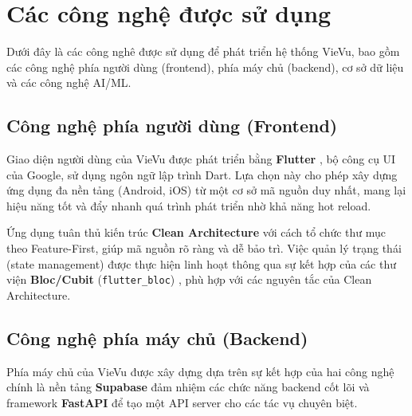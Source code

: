 \section{Các công nghệ được sử dụng}
Dưới đây là các công nghê được sử dụng để phát triển hệ thống VieVu, bao gồm các công nghệ phía người dùng (frontend), phía máy chủ (backend), cơ sở dữ liệu và các công nghệ AI/ML.
\subsection{Công nghệ phía người dùng (Frontend)}
\label{subsec:frontend_tech}

Giao diện người dùng của VieVu được phát triển bằng \textbf{Flutter} \cite{flutter_doc}, bộ công cụ UI của Google, sử dụng ngôn ngữ lập trình Dart. Lựa chọn này cho phép xây dựng ứng dụng đa nền tảng (Android, iOS) từ một cơ sở mã nguồn duy nhất, mang lại hiệu năng tốt và đẩy nhanh quá trình phát triển nhờ khả năng hot reload.

Ứng dụng tuân thủ kiến trúc \textbf{Clean Architecture} \cite{clean_arch} với cách tổ chức thư mục theo Feature-First, giúp mã nguồn rõ ràng và dễ bảo trì. Việc quản lý trạng thái (state management) được thực hiện linh hoạt thông qua sự kết hợp của các thư viện \textbf{Bloc/Cubit} (\texttt{flutter\_bloc}) \cite{bloc_package}, phù hợp với các nguyên tắc của Clean Architecture.

\subsection{Công nghệ phía máy chủ (Backend)}
\label{subsec:backend_tech}

Phía máy chủ của VieVu được xây dựng dựa trên sự kết hợp của hai công nghệ chính là nền tảng \textbf{Supabase} đảm nhiệm các chức năng backend cốt lõi và framework \textbf{FastAPI} để tạo một API server cho các tác vụ chuyên biệt.

